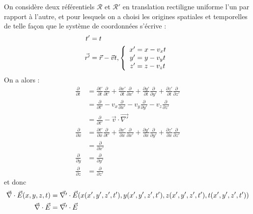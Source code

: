On considère deux référentiels $\mathcal{R}$ et $\mathcal{R}'$ en translation rectiligne uniforme l'un par rapport à l'autre, et pour lesquels on a choisi les origines spatiales et temporelles de telle façon que le système de coordonnées s'écrive :
\begin{align*}
	t'&=t\\
	\vec{r'}&=\vec{r}-\vec{v}t, \left\{ \begin{array}{r@{\;}l}
			x'&=x-v_{x}t \\
			y'&=y-v_{y}t \\
			z'&=z-v_{z}t \\
		\end{array} \right.
\end{align*}
On a alors :
\begin{align*}
	\frac{\partial}{\partial t}&=\frac{\partial t'}{\partial t} \frac{\partial}{\partial t'}
			+\frac{\partial x'}{\partial t} \frac{\partial}{\partial x'}
			+\frac{\partial y'}{\partial t} \frac{\partial}{\partial y'}
			+\frac{\partial z'}{\partial t} \frac{\partial}{\partial z'}\\
	&=\frac{\partial}{\partial t'} - v_{x} \frac{\partial}{\partial x'}
			- v_{y} \frac{\partial}{\partial y'}
			- v_{z} \frac{\partial}{\partial z'}\\
	&=\frac{\partial}{\partial t'} - \vec{v}\cdot \vec{\nabla '}\\[10pt]
	\frac{\partial}{\partial x}&=\frac{\partial t'}{\partial x} \frac{\partial}{\partial t'}
			+\frac{\partial x'}{\partial x} \frac{\partial}{\partial x'}
			+\frac{\partial y'}{\partial x} \frac{\partial}{\partial y'}
			+\frac{\partial z'}{\partial x} \frac{\partial}{\partial z'}\\
	&=\frac{\partial}{\partial x'}\\
	\frac{\partial}{\partial y}&=\frac{\partial}{\partial y'}\\
	\frac{\partial}{\partial z}&=\frac{\partial}{\partial z'}
\end{align*}
et donc 
\begin{align*}
	\vec{\nabla}\cdot\vec{E}(x,y,z,t)&=\vec{\nabla '}\cdot\vec{E}(x(x',y',z',t'),y(x',y',z',t'),z(x',y',z',t'),t(x',y',z',t'))\\ 
	\vec{\nabla}\cdot\vec{E}&=\vec{\nabla '}\cdot\vec{E}
\end{align*}

